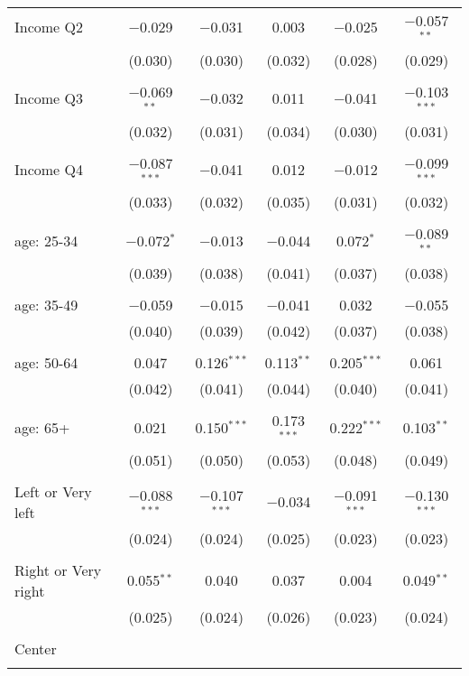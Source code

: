 \begin{tabular}{@{\extracolsep{5pt}}lccccc}
 Income Q2 & $-$0.029 & $-$0.031 & 0.003 & $-$0.025 & $-$0.057$^{**}$ \\ 
  & (0.030) & (0.030) & (0.032) & (0.028) & (0.029) \\ 
  & & & & & \\ 
 Income Q3 & $-$0.069$^{**}$ & $-$0.032 & 0.011 & $-$0.041 & $-$0.103$^{***}$ \\ 
  & (0.032) & (0.031) & (0.034) & (0.030) & (0.031) \\ 
  & & & & & \\ 
 Income Q4 & $-$0.087$^{***}$ & $-$0.041 & 0.012 & $-$0.012 & $-$0.099$^{***}$ \\ 
  & (0.033) & (0.032) & (0.035) & (0.031) & (0.032) \\ 
  & & & & & \\ 
 age: 25-34 & $-$0.072$^{*}$ & $-$0.013 & $-$0.044 & 0.072$^{*}$ & $-$0.089$^{**}$ \\ 
  & (0.039) & (0.038) & (0.041) & (0.037) & (0.038) \\ 
  & & & & & \\ 
 age: 35-49 & $-$0.059 & $-$0.015 & $-$0.041 & 0.032 & $-$0.055 \\ 
  & (0.040) & (0.039) & (0.042) & (0.037) & (0.038) \\ 
  & & & & & \\ 
 age: 50-64 & 0.047 & 0.126$^{***}$ & 0.113$^{**}$ & 0.205$^{***}$ & 0.061 \\ 
  & (0.042) & (0.041) & (0.044) & (0.040) & (0.041) \\ 
  & & & & & \\ 
 age: 65+ & 0.021 & 0.150$^{***}$ & 0.173$^{***}$ & 0.222$^{***}$ & 0.103$^{**}$ \\ 
  & (0.051) & (0.050) & (0.053) & (0.048) & (0.049) \\ 
  & & & & & \\ 
 Left or Very left & $-$0.088$^{***}$ & $-$0.107$^{***}$ & $-$0.034 & $-$0.091$^{***}$ & $-$0.130$^{***}$ \\ 
  & (0.024) & (0.024) & (0.025) & (0.023) & (0.023) \\ 
  & & & & & \\ 
 Right or Very right & 0.055$^{**}$ & 0.040 & 0.037 & 0.004 & 0.049$^{**}$ \\ 
  & (0.025) & (0.024) & (0.026) & (0.023) & (0.024) \\ 
  & & & & & \\ 
 Center &  &  &  &  &  \\ 
  &  &  &  &  &  \\ 

\end{tabular}
